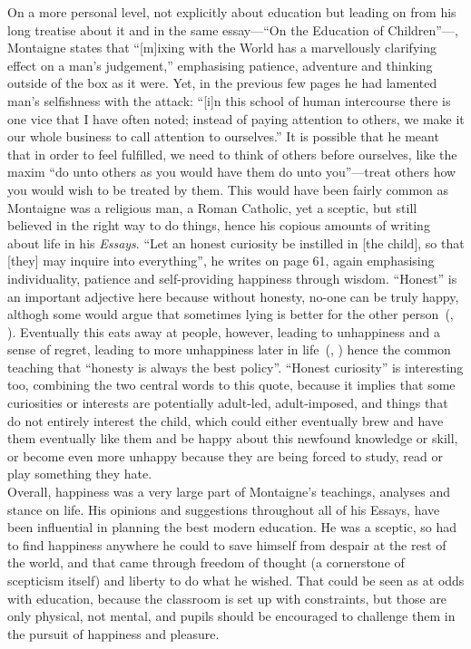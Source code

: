\documentclass[12pt,a4paper]{article}
\begin{document}
On a more personal level, not explicitly about education but leading
on from his long treatise about it and in the same essay---``On the
Education of Children''---, Montaigne states that ``[m]ixing with the
World has a marvellously clarifying effect on a man's judgement,''
emphasising patience, adventure and thinking outside of the box as it
were. Yet, in the previous few pages he had lamented man's selfishness
with the attack: ``[i]n this school of human intercourse there is one
vice that I have often noted; instead of paying attention to others,
we make it our whole business to call attention to ourselves.'' It is
possible that he meant that in order to feel fulfilled, we need to
think of others before ourselves, like the maxim ``do unto others as
you would have them do unto you''---treat others how you would wish to
be treated by them. This would have been fairly common as Montaigne
was a religious man, a Roman Catholic, yet a sceptic, but still
believed in the right way to do things, hence his copious amounts of
writing about life in his \textit{Essays}. ``Let an honest curiosity
be instilled in [the child], so that [they] may inquire into
everything'', he writes on page 61, again emphasising individuality,
patience and self-providing happiness through wisdom. ``Honest'' is an
important adjective here because without honesty, no-one can be truly
happy, althogh some would argue that sometimes lying is better for the
other person~(\citeauthor{lying-better}, \citeyear{lying-better}).
Eventually this eats away at people, however, leading to unhappiness
and a sense of regret, leading to more unhappiness later in
life~(\citeauthor{lying-unhappy}, \citeyear{lying-unhappy}) hence the
common teaching that ``honesty is always the best policy''. ``Honest
curiosity'' is interesting too, combining the two central words to
this quote, because it implies that some curiosities or interests are
potentially adult-led, adult-imposed, and things that do not entirely
interest the child, which could either eventually brew and have them
eventually like them and be happy about this newfound knowledge or
skill, or become even more unhappy because they are being forced to
study, read or play something they hate.\\

Overall, happiness was a very large part of Montaigne's teachings,
analyses and stance on life. His opinions and suggestions throughout
all of his Essays, have been influential in planning the best modern
education. He was a sceptic, so had to find happiness anywhere he
could to save himself from despair at the rest of the world, and that
came through freedom of thought (a cornerstone of scepticism itself)
and liberty to do what he wished. That could be seen as at odds with
education, because the classroom is set up with constraints, but those
are only physical, not mental, and pupils should be encouraged to
challenge them in the pursuit of happiness and pleasure.



\end{document}
